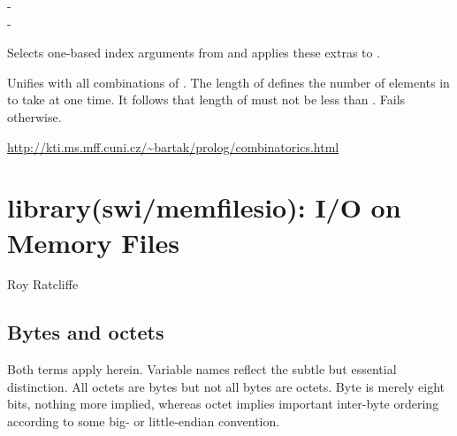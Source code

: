 \begin{description}
\begin{tags}
-  \\- 
\end{tags}

Selects one-based index arguments from  and applies these
extras to .

Unifies  with all combinations of . The length of 
defines the number of elements in  to take at one time. It
follows that length of  must not be less than . Fails
otherwise.

\begin{tags}
\url{http://kti.ms.mff.cuni.cz/~bartak/prolog/combinatorics.html}
\end{tags}
\end{description}

\chapter{library(swi/memfilesio): I/O on Memory Files}\label{sec:memfilesio}

\begin{tags}
Roy Ratcliffe
\end{tags}

\section{Bytes and octets}

Both terms apply herein. Variable names reflect the subtle
but essential distinction. All octets are bytes but not all bytes are
octets. Byte is merely eight bits, nothing more implied, whereas octet
implies important inter-byte ordering according to some big- or
little-endian convention.\vspace{0.7cm}

